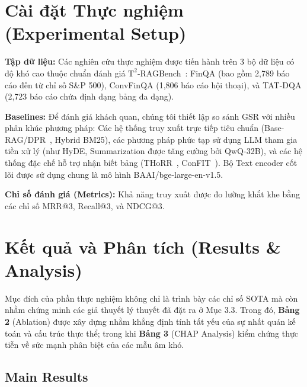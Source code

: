\documentclass[10pt, a4paper]{article}
\begin{document}
\section{Cài đặt Thực nghiệm (Experimental Setup)}

\textbf{Tập dữ liệu:} Các nghiên cứu thực nghiệm được tiến hành trên 3 bộ dữ liệu có độ khó cao thuộc chuẩn đánh giá $\mathrm{T}^2$-RAGBench~\cite{strich2026t2ragbench}: FinQA (bao gồm 2,789 báo cáo đến từ chỉ số S\&P 500), ConvFinQA (1,806 báo cáo hội thoại), và TAT-DQA (2,723 báo cáo chứa định dạng bảng đa dạng). 

\textbf{Baselines:} Để đánh giá khách quan, chúng tôi thiết lập so sánh GSR với nhiều phân khúc phương pháp: Các hệ thống truy xuất trực tiếp tiêu chuẩn (Base-RAG/DPR~\cite{karpukhin2020dpr}, Hybrid BM25), các phương pháp phức tạp sử dụng LLM tham gia tiền xử lý (như HyDE, Summarization được tăng cường bởi QwQ-32B), và các hệ thống đặc chế hỗ trợ nhận biết bảng (THoRR~\cite{thorr2024}, ConFIT~\cite{confit2025}). Bộ Text encoder cốt lõi được sử dụng chung là mô hình BAAI/bge-large-en-v1.5.

\textbf{Chỉ số đánh giá (Metrics):} Khả năng truy xuất được đo lường khắt khe bằng các chỉ số MRR@3, Recall@3, và NDCG@3.

\section{Kết quả và Phân tích (Results \& Analysis)}

Mục đích của phần thực nghiệm không chỉ là trình bày các chỉ số SOTA mà còn nhằm chứng minh các giả thuyết lý thuyết đã đặt ra ở Mục 3.3. Trong đó, \textbf{Bảng 2} (Ablation) được xây dựng nhằm khẳng định tính tất yếu của sự nhất quán kế toán và cấu trúc thực thể; trong khi \textbf{Bảng 3} (CHAP Analysis) kiểm chứng thực tiễn về sức mạnh phân biệt của các mẫu âm khó.

\subsection{Main Results}
\end{document}
